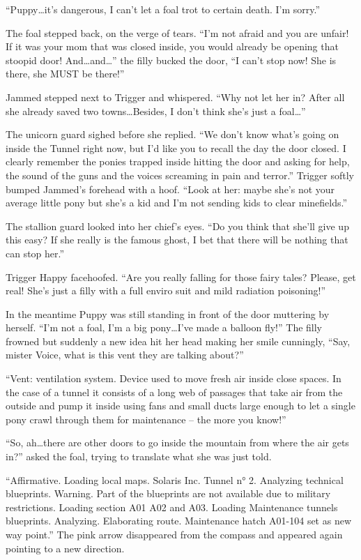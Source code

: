 ``Puppy\dots it's dangerous, I can't let a foal trot to certain death. I'm sorry.''

The foal stepped back, on the verge of tears. ``I'm not afraid and you are unfair! If it was your mom that was closed inside, you would already be opening that stoopid door! And\dots and\dots'' the filly bucked the door, ``I can't stop now! She is there, she MUST be there!''

Jammed stepped next to Trigger and whispered. ``Why not let her in? After all she already saved two towns\dots Besides, I don't think she's just a foal\dots''

The unicorn guard sighed before she replied. ``We don't know what's going on inside the Tunnel right now, but I'd like you to recall the day the door closed. I clearly remember the ponies trapped inside hitting the door and asking for help, the sound of the guns and the voices screaming in pain and terror.'' Trigger softly bumped Jammed's forehead with a hoof. ``Look at her: maybe she's not your average little pony but she's a kid and I'm not sending kids to clear minefields.''

The stallion guard looked into her chief's eyes. ``Do you think that she'll give up this easy? If she really is the famous ghost, I bet that there will be nothing that can stop her.''

Trigger Happy facehoofed. ``Are you really falling for those fairy tales? Please, get real! She's just a filly with a full enviro suit and mild radiation poisoning!''

In the meantime Puppy was still standing in front of the door muttering by herself. ``I'm not a foal, I'm a big pony\dots I've made a balloon fly!'' The filly frowned but suddenly a new idea hit her head making her smile cunningly, ``Say, mister Voice, what is this vent they are talking about?''

``{\mt Vent: ventilation system. Device used to move fresh air inside close spaces. In the case of a tunnel it consists of a long web of passages that take air from the outside and pump it inside using fans and small ducts large enough to let a single pony crawl through them for maintenance -- the more you know!}''

``So, ah\dots there are other doors to go inside the mountain from where the air gets in?'' asked the foal, trying to translate what she was just told.

``{\mt Affirmative. Loading local maps. Solaris Inc. Tunnel n° 2. Analyzing technical blueprints. Warning. Part of the blueprints are not available due to military restrictions. Loading section A01 A02 and A03. Loading Maintenance tunnels blueprints. Analyzing. Elaborating route. Maintenance hatch A01-104 set as new way point.}'' The pink arrow disappeared from the compass and appeared again pointing to a new direction.

